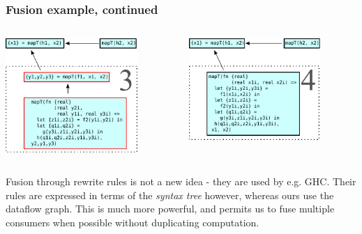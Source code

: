 \documentclass[rgb,dvipsnames]{beamer}
\begin{document}
\begin{frame}[t]
  \frametitle{Fusion example, continued}

  \centering
  \begin{columns}
    \begin{column}[T]{0.48\textwidth}
      \includegraphics[width=5cm]{img/fusion-3.pdf}
    \end{column}\hfill
    \begin{column}[T]{0.48\textwidth}
      \includegraphics[width=5cm]{img/fusion-4.pdf}
    \end{column}
  \end{columns}

  Fusion through rewrite rules is not a new idea - they are used by
  e.g.  GHC.  Their rules are expressed in terms of the \textit{syntax
    tree} however, whereas ours use the dataflow graph.  This is much
  more powerful, and permits us to fuse multiple consumers when
  possible without duplicating computation.

\end{frame}
\end{document}
